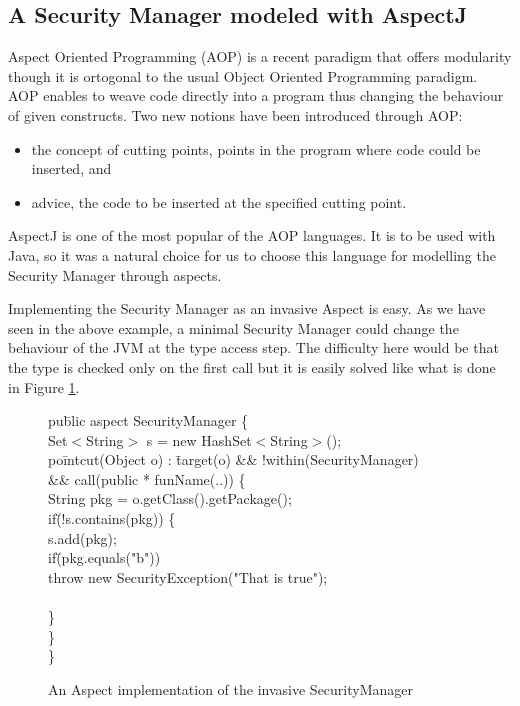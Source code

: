 \subsection{A Security Manager modeled with AspectJ}
Aspect Oriented Programming (AOP) is a recent paradigm that offers
modularity though it is ortogonal to the usual Object Oriented
Programming paradigm. AOP enables to weave code directly into a
program thus changing the behaviour of given constructs. Two new
notions have been introduced through AOP:
\begin{itemize}
\item the concept of cutting points, points in the program where code
could be inserted, and
\item advice, the code to be inserted at the specified cutting point.
\end{itemize}
AspectJ is one of the most popular of the AOP languages. It is to be
used with Java, so it was a natural choice for us to choose this
language for modelling the Security Manager through aspects.

Implementing the Security Manager as an invasive Aspect is easy.  As
we have seen in the above example, a minimal Security Manager could
change the behaviour of the JVM at the type access step. The
difficulty here would be that the type is checked only on the first
call but it is easily solved like what is done in Figure \ref{base_implem}.
%
\begin{figure}
\bcode
pu\=blic aspect SecurityManager \{\+\\

Set$<$String$>$ s = new HashSet$<$String$>$();\\
po\=intcut(Object o) : \=target(o) \&\& !within(SecurityManager)\+ \\
           \>\&\& call(public * funName(..)) \{\\
    String pkg = o.getClass().getPackage();\\
    if\=(!s.contains(pkg)) \{\+\\     
       s.add(pkg);\\
       if\=(pkg.equals("b"))\\
           \>throw new SecurityException("That is true");\\\-\\ 
    \}\-\\
\}\-\\
\}
\ecode
\caption{An Aspect implementation of the invasive SecurityManager}
\label{base_implem}
\end{figure}



